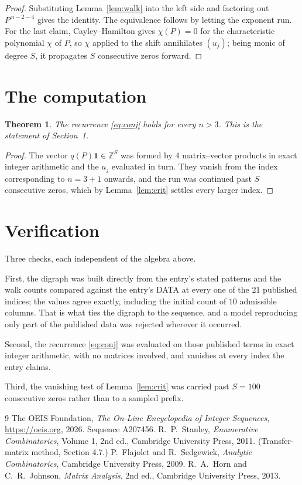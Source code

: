 \documentclass[11pt,a4paper]{article}
\theoremstyle{plain}
\newtheorem{theorem}{Theorem}
\theoremstyle{definition}
\begin{document}
\begin{proof}
Substituting Lemma~\ref{lem:walk} into the left side and factoring out
$P^{\,n-2-4}$ gives the identity. The equivalence follows by letting the exponent
run. For the last claim, Cayley--Hamilton gives $\chi(P)=0$ for the characteristic
polynomial $\chi$ of $P$, so $\chi$ applied to the shift annihilates $(u_j)$; being monic of
degree $S$, it propagates $S$ consecutive zeros forward.
\end{proof}

\section{The computation}

\begin{theorem}
The recurrence \eqref{eq:conj} holds for every $n>3$. This is the statement of
Section~1.
\end{theorem}

\begin{proof}
The vector $q(P)\mathbf{1}\in\mathbb{Z}^{S}$ was formed by $4$ matrix--vector
products in exact integer arithmetic and the $u_j$ evaluated in turn. They vanish from the
index corresponding to $n=3+1$ onwards, and the run was continued past $S$ consecutive
zeros, which by Lemma~\ref{lem:crit} settles every larger index.
\end{proof}

\section{Verification}

Three checks, each independent of the algebra above.

First, the digraph was built directly from the entry's stated patterns and the walk counts
compared against the entry's DATA at every one of the $21$ published indices; the
values agree exactly, including the initial count of $10$ admissible columns. That is
what ties the digraph to the sequence, and a model reproducing only part of the published
data was rejected wherever it occurred.

Second, the recurrence \eqref{eq:conj} was evaluated on those published terms in exact
integer arithmetic, with no matrices involved, and vanishes at every index the entry claims.

Third, the vanishing test of Lemma~\ref{lem:crit} was carried past $S=100$ consecutive
zeros rather than to a sampled prefix.

\begin{thebibliography}{9}
 The OEIS Foundation, \emph{The On-Line Encyclopedia of Integer
Sequences}, \url{https://oeis.org}, 2026. Sequence A207456.
 R.~P.~Stanley, \emph{Enumerative Combinatorics}, Volume 1, 2nd ed.,
Cambridge University Press, 2011. (Transfer-matrix method, Section 4.7.)
 P.~Flajolet and R.~Sedgewick, \emph{Analytic Combinatorics}, Cambridge
University Press, 2009.
 R.~A.~Horn and C.~R.~Johnson, \emph{Matrix Analysis}, 2nd ed., Cambridge
University Press, 2013.
\end{thebibliography}
\end{document}
